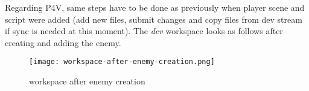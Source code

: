 Regarding P4V, same steps have to be done as previously when player scene and script were added (add new files,
submit changes and copy files from dev stream if sync is needed at this moment). The \textit{dev} workspace looks as 
follows after creating and adding the enemy.
\begin{figure}[H]
  \centering
  \texttt{[image: workspace-after-enemy-creation.png]}
  \caption{workspace after enemy creation}
  \label{fig:workspace-after-enemy-creation}
\end{figure}